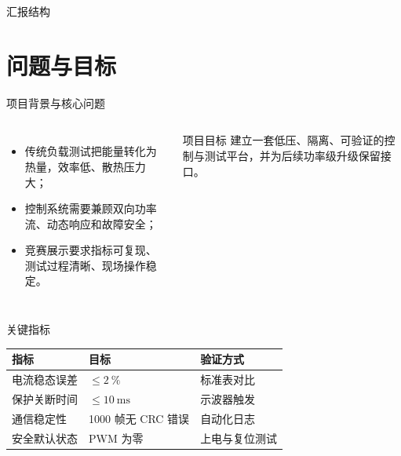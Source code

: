 \documentclass[aspectratio=169,10pt,fontset=fandol]{ctexbeamer}
\title{\TalkTitle}
\subtitle{\TalkSubtitle}
\author{\AuthorName}
\institute{\InstituteName}
\date{\today}
\begin{document}
\begin{frame}
  \titlepage
\end{frame}

\begin{frame}{汇报结构}
  \tableofcontents
\end{frame}

\section{问题与目标}
\begin{frame}{项目背景与核心问题}
  \begin{columns}[T]
    \begin{itemize}
      \item 传统负载测试把能量转化为热量，效率低、散热压力大；
      \item 控制系统需要兼顾双向功率流、动态响应和故障安全；
      \item 竞赛展示要求指标可复现、测试过程清晰、现场操作稳定。
    \end{itemize}
    \begin{block}{项目目标}
      建立一套低压、隔离、可验证的控制与测试平台，并为后续功率级升级保留接口。
    \end{block}
  \end{columns}
\end{frame}

\begin{frame}{关键指标}
  \centering
  \begin{tabular}{lll}
    \toprule
    指标 & 目标 & 验证方式 \\
    \midrule
    电流稳态误差 & $\leq\qty{2}{\percent}$ & 标准表对比 \\
    保护关断时间 & $\leq\qty{10}{\milli\second}$ & 示波器触发 \\
    通信稳定性 & 1000 帧无 CRC 错误 & 自动化日志 \\
    安全默认状态 & PWM 为零 & 上电与复位测试 \\
    \bottomrule
  \end{tabular}
\end{frame}
\end{document}
